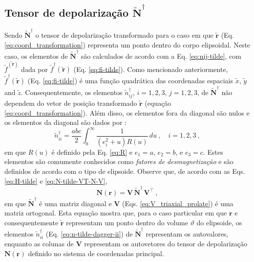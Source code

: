 \subsection{Tensor de depolarização $\tilde{\mathbf{N}}^{\dagger}$}

Sendo $\tilde{\mathbf{N}}^{\dagger}$ o tensor de depolarização transformado para o caso em que $\tilde{\mathbf{r}}$ (Eq. \ref{eq:coord_transformation}) representa um ponto dentro do corpo elipsoidal. Neste caso, os elementos de $\tilde{\mathbf{N}}^{\dagger}$ são calculados de acordo com a Eq. \ref{eq:nij-tilde}, com $\tilde{f}^(\tilde{\mathbf{r}})$ dada por $\tilde{f}^{\dagger}(\tilde{\mathbf{r}})$ (Eq. \ref{eq:fi-tilde}). 
Como mencionado anteriormente, $\tilde{f}^{\dagger}(\tilde{\mathbf{r}})$ (Eq. \ref{eq:fi-tilde}) é uma função quadrática das coordenadas espaciais $\tilde{x}$, $\tilde{y}$ and $\tilde{z}$. Consequentemente, os elementos $\tilde{n}^{\dagger}_{ij}$, $i = 1, 2, 3$, $j = 1, 2, 3$, de $\tilde{\mathbf{N}}^{\dagger}$ não dependem do vetor de posição transformado $\tilde{\mathbf{r}}$ (equação \ref{eq:coord_transformation}). Além disso, os elementos fora da diagonal são nulos e os elementos da diagonal são dados por \citep{stoner1945}: 
\begin{equation}
\tilde{n}^{\dagger}_{ii} = \frac{abc}{2}
\int_{0}^{\infty} \frac{1}{\left( e_{i}^{2} 
	+ u \right) R(u)} \, du \: , \quad i = 1, 2, 3 \: ,
\label{eq:n-tilde-dagger-ii}
\end{equation}
em que $R(u)$ é definido pela Eq. \ref{eq:R} e
$e_{1} = a$, $e_{2} = b$, e $e_{3} = c$. Estes elementos são comumente conhecidos como \textit{fatores de desmagnetização} e são definidos de acordo com o tipo de elipsoide. Observe que, de acordo com as Eqs. \ref{eq:H-tilde} e \ref{eq:N-tilde-VT-N-V},
\begin{equation}
\mathbf{N}(\mathbf{r}) = 
\mathbf{V} \, \tilde{\mathbf{N}}^{\dagger} \, 
\mathbf{V}^{\top} \: ,
\label{eq:N-V-N-dagger-VT}
\end{equation}
em que $\tilde{\mathbf{N}}^{\dagger}$ é uma matriz diagonal e $\mathbf{V}$ (Eqs. \ref{eq:V_triaxial_prolate}) é uma matriz ortogonal. Esta equação mostra que, para o caso particular em que $\mathbf{r}$ e consequentemente $\tilde{\mathbf{r}}$ representam um ponto dentro do volume $\vartheta$ do elipsoide, os elementos $\tilde{n}^{\dagger}_{ii}$ (Eq. \ref{eq:n-tilde-dagger-ii})
de $\tilde{\mathbf{N}}^{\dagger}$ representam os autovalores, enquanto as colunas de $\mathbf{V}$ representam os autovetores do tensor de depolarização $\mathbf{N}(\mathbf{r})$ definido no sistema de coordenadas principal.

